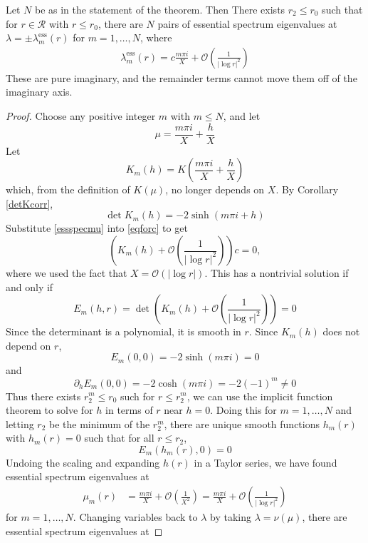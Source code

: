 \documentclass[thesis.tex]{subfiles}
\begin{document}
\begin{lemma}\label{essspeclemma}
Let $N$ be as in the statement of the theorem. Then There exists $r_2 \leq r_0$ such that for $r \in \mathcal{R}$ with $r \leq r_0$, there are $N$ pairs of essential spectrum eigenvalues at $\lambda = \pm \lambda_m^{\text{ess}}(r)$ for $m = 1, \dots, N$, where
\begin{align}
\lambda^{\text{ess}}_m(r) = c \frac{m \pi i }{X} + \mathcal{O}\left( \frac{1}{|\log r|^2} \right)
\end{align}
These are pure imaginary, and the remainder terms cannot move them off of the imaginary axis.

\begin{proof}
Choose any positive integer $m$ with $m \leq N$, and let
\begin{equation}\label{essspecmu}
\mu = \frac{m \pi i}{X} + \frac{h}{X}
\end{equation}
Let 
\[
K_m(h) =  K\left( \frac{m \pi i}{X} + \frac{h}{X} \right)
\]
which, from the definition of $K(\mu)$, no longer depends on $X$. By Corollary \ref{detKcorr},
\[
\det K_m(h) = -2\sinh(m \pi i + h)
\]
Substitute \cref{essspecmu} into \cref{eqforc} to get
\[
\left( K_m(h) + \mathcal{O}\left( {\frac{1}{|\log r|^2}} \right)\right)c = 0,
\]
where we used the fact that $X = \mathcal{O}(|\log r|)$. This has a nontrivial solution if and only if
\begin{equation}\label{defEmess}
E_m(h, r) = \det \left( K_m(h) + \mathcal{O}\left( {\frac{1}{|\log r|^2}} \right)\right) = 0
\end{equation}
Since the determinant is a polynomial, it is smooth in $r$. Since $K_m(h)$ does not depend on $r$,
\[
E_m(0, 0) = -2 \sinh(m \pi i) = 0
\]
and 
\[
\partial_h E_m(0, 0) = -2 \cosh(m \pi i) = -2(-1)^m \neq 0
\]
Thus there exists $r_2^m \leq r_0$ such for $r \leq r_2^m$, we can use the implicit function theorem to solve for $h$ in terms of $r$ near $h = 0$. Doing this for $m = 1, \dots, N$ and letting $r_2$ be the minimum of the $r_2^m$, there are unique smooth functions $h_m(r)$ with $h_m(r) = 0$ such that for all $r \leq r_2$,
\[
E_m(h_m(r), 0) = 0
\]
Undoing the scaling and expanding $h(r)$ in a Taylor series, we have found essential spectrum eigenvalues at
\begin{align}\label{muess}
\mu_m(r) &= \frac{m \pi i}{X} + \mathcal{O}\left(\frac{1}{X^2}\right) = \frac{m \pi i}{X} + \mathcal{O}\left(\frac{1}{|\log r|^2}\right) 
\end{align}
for $m = 1, \dots, N$. Changing variables back to $\lambda$ by taking $\lambda = \nu(\mu)$, there are essential spectrum eigenvalues at

\end{proof}
\end{lemma}
\end{document}

